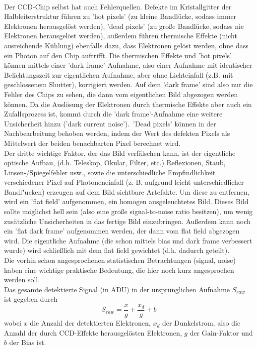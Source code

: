 \\
Der CCD-Chip selbst hat auch Fehlerquellen. Defekte im Kristallgitter der Halbleiterstruktur führen zu 'hot pixels' (zu kleine Bandlücke, sodass immer Elektronen herausgelöst werden), 'dead pixels' (zu große Bandlücke, sodass nie Elektronen herausgelöst werden), außerdem führen thermische Effekte (nicht ausreichende Kühlung) ebenfalls dazu, dass Elektronen gelöst werden, ohne dass ein Photon auf den Chip auftrifft. Die thermischen Effekte und 'hot pixels' können mittels einer 'dark frame'-Aufnahme, also einer Aufnahme mit identischer Belichtungszeit zur eigentlichen Aufnahme, aber ohne Lichteinfall (z.B. mit geschlossenem Shutter), korrigiert werden. Auf dem 'dark frame' sind also nur die Fehler des Chips zu sehen, die dann vom eigentlichen Bild abgezogen werden können. Da die Auslösung der Elektronen durch thermische Effekte aber auch ein Zufallsprozess ist, kommt durch die 'dark frame'-Aufnahme eine weitere Unsicherheit hinzu ('dark current noise').\
'Dead pixels' können in der Nachbearbeitung behoben werden, indem der Wert des defekten Pixels als Mittelwert der beiden benachbarten Pixel berechnet wird.
\\
Der dritte wichtige Faktor, der das Bild verfälschen kann, ist der eigentliche optische Aufbau, (d.h. Teleskop, Okular, Filter, etc.) Reflexionen, Staub, Linsen-/Spiegelfehler usw., sowie die unterschiedliche Empfindlichkeit verschiedener Pixel auf Photoneneinfall (z. B. aufgrund leicht unterschiedlicher Bandl"ucken) erzeugen auf dem Bild sichtbare Artefakte. Um diese zu entfernen, wird ein 'flat field' aufgenommen, ein homogen ausgeleuchtetes Bild. Dieses Bild sollte möglichst hell sein (also eine große signal-to-noise ratio besitzen), um wenig zusätzliche Unsicherheiten in das fertige Bild einzubringen. Außerdem kann noch ein 'flat dark frame' aufgenommen werden, der dann vom flat field abgezogen wird. Die eigentliche Aufnahme (die schon mittels bias und dark frame verbessert wurde) wird schließlich mit dem flat field gewichtet (d.h. dadurch geteilt).
\\
Die vorhin schon angesprochenen statistischen Betrachtungen (signal, noise) haben eine wichtige praktische Bedeutung, die hier noch kurz angesprochen werden soll.
\\
Das gesamte detektierte Signal (in ADU) in der ursprünglichen Aufnahme $S_{raw}$ ist gegeben durch
\begin{equation}
S_{raw} = \frac{x}{g} + \frac{x_d}{g} + b
\end{equation}
wobei $x$ die Anzahl der detektierten Elektronen, $x_d$ der Dunkelstrom, also die Anzahl der durch CCD-Effekte herausgelösten Elektronen, $g$ der Gain-Faktor und $b$ der Bias ist.
